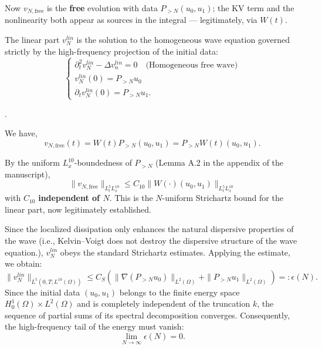 \documentclass[11pt,letterpaper]{amsart}
\begin{document}
Now $v_{N,\mathrm{free}}$ is the \textbf{free} evolution with data $P_{> N}(u_0,u_1)$; the KV
term and the nonlinearity both appear as sources in the integral --- legitimately, via $W(t)$.

The linear part $v_N^{lin}$ is the solution to the homogeneous wave equation governed strictly by the high-frequency projection of the initial data:
\begin{equation}
\begin{cases}
   \partial_t^2 v_N^{lin} - \Delta v_n^{lin}= 0 \quad \text{(Homogeneous free wave)} \\
    v_N^{lin}(0) = P_{>N} u_0 \\
    \partial_t v_N^{lin}(0) = P_{>N} u_1.
\end{cases}
\end{equation}

.

We have,
\[
v_{N,\mathrm{free}}(t) = W(t)P_{>  N}(u_0,u_1) = P_{> N}W(t)(u_0,u_1).
\]

By the uniform $L^{10}_x$-boundedness of $P_{> N}$ (Lemma A.2 in the appendix of the manuscript),
\[
\|v_{N,\mathrm{free}}\|_{L^5_tL^{10}_x} \le C_{10}\|W(\cdot)(u_0,u_1)\|_{L^5_tL^{10}_x}
\]
with $C_{10}$  \textbf{independent of $N$}. This is the $N$-uniform Strichartz
bound for the linear part, now legitimately established.

Since the localized dissipation only enhances the natural dispersive properties of the wave (i.e., Kelvin–Voigt does not destroy the dispersive structure of the wave equation.), $v_N^{lin}$ obeys the standard Strichartz estimates. Applying the estimate, we obtain:
\begin{equation}\label{eq:strichartz_alta_linear}
    \|v_N^{lin}\|_{L^5(0,T; L^{10}(\Omega))} \le C_S \left( \|\nabla (P_{>N} u_0)\|_{L^2(\Omega)} + \|P_{>N} u_1\|_{L^2(\Omega)} \right) =: \epsilon(N).
\end{equation}
Since the initial data $(u_0, u_1)$ belongs to the finite energy space $H_0^1(\Omega) \times L^2(\Omega)$ and is completely independent of the truncation $k$, the sequence of partial sums of its spectral decomposition converges. Consequently, the high-frequency tail of the energy must vanish:
\begin{equation}\label{eq:tail_vanishes}
    \lim_{N \to \infty} \epsilon(N) = 0.
\end{equation}
\end{document}
